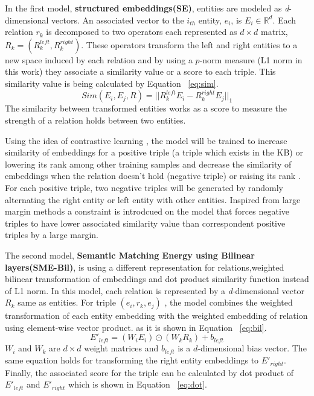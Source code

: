    In the first model, \textbf{structured embeddings(SE)}, entities are modeled as \textit{d}-dimensional vectors.
    An associated vector to the $i_{th}$ entity, $e_{i}$, is $E_{i} \in \mathbb{R}^{d}$. Each relation $r_{k}$  
    is decomposed to two operators each represented as $d \times d$ matrix, $ R_k = (R_{k}^{left}, R_{k}^{right})$. 
    These operators transform the left and right entities to a new space induced by each relation and by using 
    a $p$-norm measure  (L1 norm in this work) they associate a similarity value or a score to each triple. 
    This similarity value is being calculated by
    Equation ~\eqref{eq:sim}. 
    \begin{equation}
    \label{eq:sim}Sim(E_{i}, E_{j}, R) = ||R_{k}^{left}E_{i} - R_{k}^{right}E_{j} ||_{1}
    \end{equation}
    The similarity between transformed entities works as a score to measure the strength of a relation holds between two entities. 
      
    Using the idea of contrastive learning , the model will be trained to increase similarity of 
    embeddings for a positive triple (a triple which exists in the KB) or lowering its rank among other training samples
    and decrease the similarity of embeddings when the relation doesn't hold (negative triple) or raising its rank . 
    For each positive triple, two negative triples will be generated by randomly alternating the right entity or left entity with other entities.
    Inspired from large margin methods a constraint is introdcued on the model that forces 
    negative triples to have lower associated similarity value  than correspondent positive triples by a large margin.
    
    The second model, \textbf{Semantic Matching Energy using Bilinear layers(SME-Bil)}, 
    is using a different representation for relations,weighted bilinear
    transformation of embeddings and  dot product similarity function instead of L1 norm. 
    In this model, each relation is represented by a \textit{d}-dimensional vector $R_{k}$ same as entities. 
    For triple $(e_{i},r_{k} , e_{j} )$ , the model combines the weighted transformation of each entity embedding with 
    the weighted embedding of relation using element-wise vector product. as it is shown in Equation ~\eqref{eq:bil}.
    \begin{equation}
    \label{eq:bil} E'_{left} = (W_{i} E_{i}) \odot (W_{k} R_{k}) + b_{left}
    \end{equation}
    $W_{i}$ and $W_{k}$ are $d \times d$ weight matrices and $b_{left}$ is a $d$-dimensional bias vector. 
    The same equation holds for transforming the right entity embeddings to $E'_{right}$. Finally, the associated score for the triple
     can be calculated by dot product of $E'_{left}$ and $E'_{right}$ which is
     shown in Equation ~\ref{eq:dot}.
    
